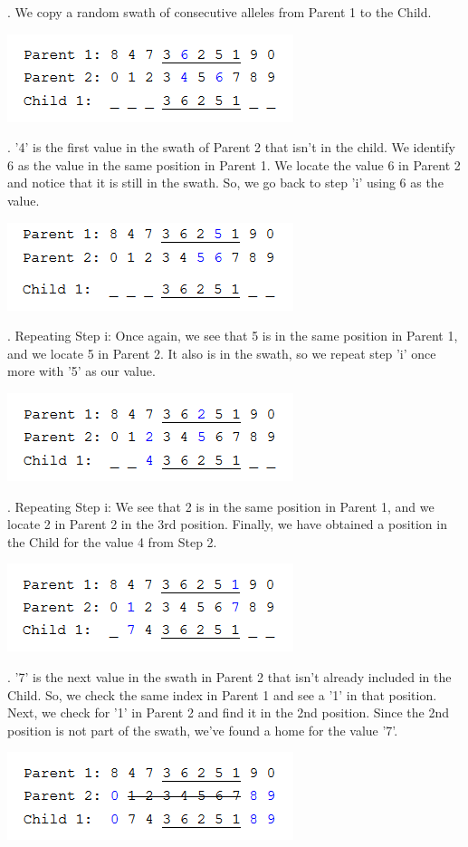 \documentclass[11pt]{article}
\begin{document}
. We copy a random swath of consecutive alleles from Parent 1 to the Child.

\includegraphics[width=0.4\linewidth]{img/pmx_example_02}

. '4' is the first value in the swath of Parent 2 that isn't in the child. We identify 6 as the value in the same position in Parent 1. We locate the value 6 in Parent 2 and notice that it is still in the swath. So, we go back to step 'i' using 6 as the value. 

\includegraphics[width=0.4\linewidth]{img/pmx_example_03}

. Repeating Step i: Once again, we see that 5 is in the same position in Parent 1, and we locate 5 in Parent 2. It also is in the swath, so we repeat step 'i' once more with '5' as our value.

\includegraphics[width=0.4\linewidth]{img/pmx_example_04}

. Repeating Step i: We see that 2 is in the same position in Parent 1, and we locate 2 in Parent 2 in the 3rd position. Finally, we have obtained a position in the Child for the value 4 from Step 2.

\includegraphics[width=0.4\linewidth]{img/pmx_example_05}

. '7' is the next value in the swath in Parent 2 that isn't already included in the Child. So, we check the same index in Parent 1 and see a '1' in that position. Next, we check for '1' in Parent 2 and find it in the 2nd position. Since the 2nd position is not part of the swath, we've found a home for the value '7'.

\includegraphics[width=0.4\linewidth]{img/pmx_example_06}
\end{document}
